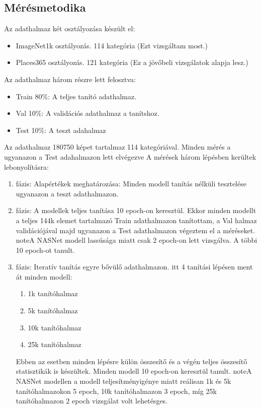 \documentclass[	
  noindent
]{elteikthesis}[2024/04/26]
\begin{document}
    \subsection{Mérésmetodika}
      Az adathalmaz két osztályozása készült el:
      \begin{itemize}
        \item ImageNet1k osztályozás. 114 kategória (Ezt vizsgáltam most.)
        \item Places365 osztályozás.  121 kategória (Ez a jövőbeli vizsgálatok alapja lesz.)
      \end{itemize}
      Az adathalmaz három részre lett felosztva:
      \begin{itemize}
        \item Train 80\%: A teljes tanító adathalmaz.
        \item Val   10\%: A validációs adathalmaz a tanítshoz.
        \item Test  10\%: A teszt adahalmaz
      \end{itemize}
      Az adathalmaz 180750 képet tartalmaz 114 kategóriával. 
      Minden mérés a ugyanazon a Test adahalmazon lett elvégezve
      A mérések három lépésben kerültek lebonyolításra:
      \begin{enumerate}
        \item fázis: Alapértékek meghatározása: Minden modell tanítás nélküli tesztelése ugyanazon a teszt adathalmazon.
        \item fázis: A modellek teljes tanítása 10 epoch-on keresztül. Ekkor minden modellt a teljes 144k elemet tartalmazó Train adathalmazon tanítottam, a Val halmaz validációjával majd ugyanazon a Test adathalmazon végeztem el a méréseket. note{A NASNet modell lassúsága miatt csak 2 epoch-on lett vizsgálva. A többi 10 epoch-ot tanult.}
        \item fázis: Iteratív tanítás egyre bővülő adathalmazon. itt 4 tanítási lépésen ment át minden modell:
        \begin{enumerate}
          \item 1k tanítóhalmaz
          \item 5k tanítóhalmaz
          \item 10k tanítóhalmaz
          \item 25k tanítóhalmaz
        \end{enumerate}
        Ebben az esetben minden lépésre külön összesítő és a végén teljes összesítő statisztikák is készültek.
        Minden modell 10 epoch-on keresztül tanult.
        note{A NASNet modellen a modell teljesítményigénye miatt reálisan 1k és 5k tanítóhalmazokon 5 epoch, 10k tanítóhalmazon 3 epoch, míg 25k tanítóhalmazon 2 epoch vizsgálat volt lehetésges.}
      \end{enumerate}
\end{document}

